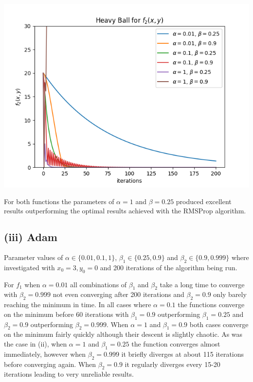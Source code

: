 \documentclass[12pt]{article}
\begin{document}
\begin{center}
    \includegraphics[scale=0.6]{figs/b/b_ii_2.png}
\end{center}

For both functions the parameters of $\alpha=1$ and $\beta=0.25$ produced excellent results outperforming the optimal results achieved with the RMSProp algorithm.

\subsection*{(iii) Adam}

Parameter values of $\alpha \in \{0.01, 0.1, 1\}$, $\beta_1 \in \{0.25, 0.9\}$ and $\beta_2 \in \{0.9, 0.999\}$ where investigated with $x_0 = 3, y_0 = 0$ and 200 iterations of the algorithm being run.

For $f_1$ when $\alpha=0.01$ all combinations of $\beta_1$ and $\beta_2$ take a long time to converge with $\beta_2=0.999$ not even converging after 200 iterations and $\beta_2=0.9$ only barely reaching the minimum in time. In all cases where $\alpha=0.1$ the functions converge on the minimum before 60 iterations with $\beta_1=0.9$ outperforming $\beta_1=0.25$ and $\beta_2=0.9$ outperforming $\beta_2=0.999$. When $\alpha=1$ and $\beta_1=0.9$ both cases converge on the minimum fairly quickly although their descent is slightly chaotic. As was the case in (ii), when $\alpha=1$ and $\beta_1=0.25$ the function converges almost immediately, however when $\beta_2=0.999$ it briefly diverges at about 115 iterations before converging again. When $\beta_2=0.9$ it regularly diverges every 15-20 iterations leading to very unreliable results.
\end{document}
